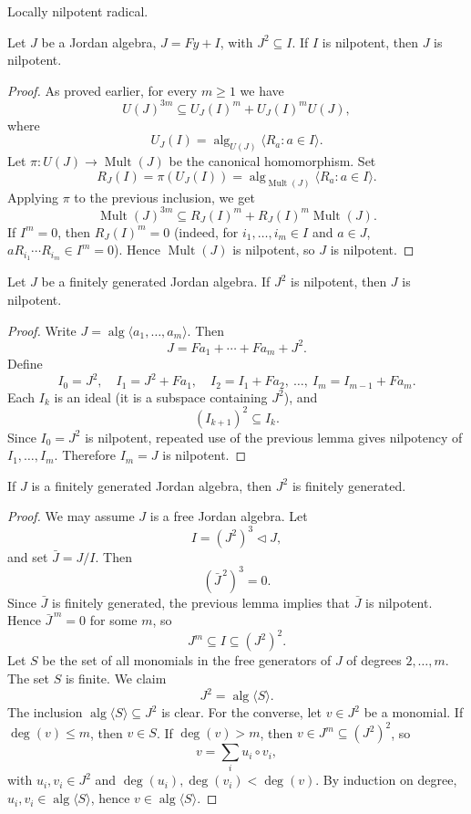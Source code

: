 \documentclass{article}
\begin{document}
Locally nilpotent radical.

\begin{lemma}
Let $J$ be a Jordan algebra, $J=Fy+I$, with $J^2 \subseteq I$. If $I$ is nilpotent, then $J$ is nilpotent.
\end{lemma}

\begin{proof}
As proved earlier, for every $m \ge 1$ we have
\[
U(J)^{3m} \subseteq U_J(I)^m + U_J(I)^m U(J),
\]
where
\[
U_J(I)=\operatorname{alg}_{U(J)}\langle R_a : a \in I \rangle.
\]
Let $\pi:U(J)\to \operatorname{Mult}(J)$ be the canonical homomorphism. Set
\[
R_J(I)=\pi(U_J(I))=\operatorname{alg}_{\operatorname{Mult}(J)}\langle R_a : a \in I \rangle.
\]
Applying $\pi$ to the previous inclusion, we get
\[
\operatorname{Mult}(J)^{3m} \subseteq R_J(I)^m + R_J(I)^m\operatorname{Mult}(J).
\]
If $I^m=0$, then $R_J(I)^m=0$ (indeed, for $i_1,\ldots,i_m\in I$ and $a\in J$,
$aR_{i_1}\cdots R_{i_m}\in I^m=0$). Hence $\operatorname{Mult}(J)$ is nilpotent, so $J$ is nilpotent.
\end{proof}

\begin{lemma}
Let $J$ be a finitely generated Jordan algebra. If $J^2$ is nilpotent, then $J$ is nilpotent.
\end{lemma}

\begin{proof}
Write $J=\operatorname{alg}\langle a_1,\ldots,a_m\rangle$. Then
\[
J=Fa_1+\cdots+Fa_m+J^2.
\]
Define
\[
I_0=J^2,\quad I_1=J^2+Fa_1,\quad I_2=I_1+Fa_2,\ \ldots,\ I_m=I_{m-1}+Fa_m.
\]
Each $I_k$ is an ideal (it is a subspace containing $J^2$), and
\[
(I_{k+1})^2\subseteq I_k.
\]
Since $I_0=J^2$ is nilpotent, repeated use of the previous lemma gives nilpotency of $I_1,\ldots,I_m$. Therefore $I_m=J$ is nilpotent.
\end{proof}

\begin{lemma}
If $J$ is a finitely generated Jordan algebra, then $J^2$ is finitely generated.
\end{lemma}

\begin{proof}
We may assume $J$ is a free Jordan algebra. Let
\[
I=(J^2)^3\triangleleft J,
\]
and set $\bar{J}=J/I$. Then
\[
(\bar{J}^{\,2})^3=0.
\]
Since $\bar{J}$ is finitely generated, the previous lemma implies that $\bar{J}$ is nilpotent. Hence $\bar{J}^{\,m}=0$ for some $m$, so
\[
J^m\subseteq I\subseteq (J^2)^2.
\]
Let $S$ be the set of all monomials in the free generators of $J$ of degrees $2,\ldots,m$. The set $S$ is finite. We claim
\[
J^2=\operatorname{alg}\langle S\rangle.
\]
The inclusion $\operatorname{alg}\langle S\rangle\subseteq J^2$ is clear. For the converse, let $v\in J^2$ be a monomial. If $\deg(v)\le m$, then $v\in S$. If $\deg(v)>m$, then $v\in J^m\subseteq (J^2)^2$, so
\[
v=\sum_i u_i\circ v_i,
\]
with $u_i,v_i\in J^2$ and $\deg(u_i),\deg(v_i)<\deg(v)$. By induction on degree, $u_i,v_i\in\operatorname{alg}\langle S\rangle$, hence $v\in\operatorname{alg}\langle S\rangle$.
\end{proof}
\end{document}
